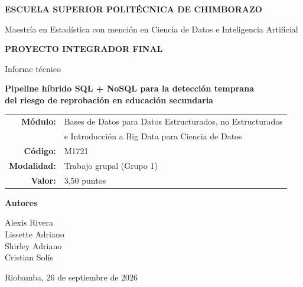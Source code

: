 \documentclass[11pt,a4paper]{article}
\begin{document}
\begin{titlepage}
\centering
\vspace*{1.2cm}
{\large\bfseries ESCUELA SUPERIOR POLITÉCNICA DE CHIMBORAZO\par}
\vspace{0.3cm}
{\normalsize Maestría en Estadística con mención en Ciencia de Datos e Inteligencia Artificial\par}
\vspace{2.4cm}
{\Large\bfseries PROYECTO INTEGRADOR FINAL\par}
\vspace{0.4cm}
{\large Informe técnico\par}
\vspace{1.2cm}
{\Large\bfseries Pipeline híbrido SQL + NoSQL para la detección temprana\\[2pt] del riesgo de reprobación en educación secundaria\par}
\vspace{2.2cm}
\begin{tabular}{rl}
\textbf{Módulo:} & Bases de Datos para Datos Estructurados, no Estructurados\\
 & e Introducción a Big Data para Ciencia de Datos \\
\textbf{Código:} & M1721 \\
\textbf{Modalidad:} & Trabajo grupal (Grupo 1) \\
\textbf{Valor:} & 3,50 puntos \\
\end{tabular}
\vspace{2cm}

{\bfseries Autores\par}
\vspace{0.2cm}
Alexis Rivera\\ Lissette Adriano\\ Shirley Adriano\\ Cristian Solís\par
\vfill
Riobamba, 26 de septiembre de 2026
\end{titlepage}

\end{document}
